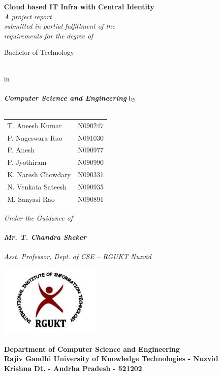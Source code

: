 \documentclass[12pt]{report}
\begin{document}
\begin{titlepage}
 \begin{center}
\LARGE
\textbf{Cloud based IT Infra with Central Identity} \\
\vfill
\small
\textit{A project report \\ submitted in partial fulfillment of the \\ requirements for the degree of  }\\
\vfill
\large
 {\LARGE{\degfntbf Bachelor of Technology} \par}
\small
\underline{}\\
in \\
\underline{}\\
\large
\textbf{\emph{Computer Science and Engineering}}
\vfill
\small
by \\
\underline{} \\
\vfill
\large
\begin{tabular}{l  l}
T. Aneesh Kumar & N090247  \\
P. Nageswara Rao  & N091030  \\
P. Anesh  & N090977  \\
P. Jyothiram & N090990  \\
K. Naresh Chowdary  & N090331  \\
N. Venkata Sateesh  & N090935  \\
M. Sanyasi Rao & N090891 
\end{tabular}
\vfill
\small
\textit{Under the Guidance of} \\
\large
\underline{} \\
\textit{\textbf{Mr. T. Chandra Sheker}} \\
\underline{}\\
\small
\textit{Asst. Professor, Dept. of CSE -- RGUKT Nuzvid} \\
\small
\vfill


\includegraphics[width=5cm]{rgukt_logo.jpg} 
\Large
\underline{} \\
\underline{} \\
\normalsize
\textbf{Department of Computer Science and Engineering } \\
\textbf{Rajiv Gandhi University of Knowledge Technologies - Nuzvid }  \\
\textbf{Krishna Dt. - Andrha Pradesh - 521202}



\end{center}
\end{titlepage}
\end{document}
